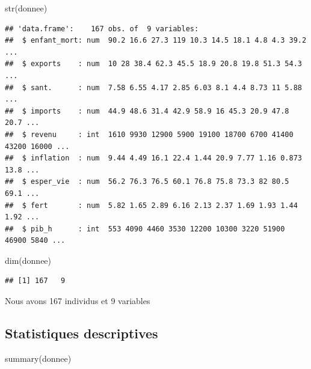 \documentclass[
]{article}
\newenvironment{Shaded}{}{}
\newcommand{\FunctionTok}[1]{#1}
\newcommand{\NormalTok}[1]{#1}
\begin{document}
\begin{Shaded}
\begin{Highlighting}[]
\FunctionTok{str}\NormalTok{(donnee)}
\end{Highlighting}
\end{Shaded}

\begin{verbatim}
## 'data.frame':    167 obs. of  9 variables:
##  $ enfant_mort: num  90.2 16.6 27.3 119 10.3 14.5 18.1 4.8 4.3 39.2 ...
##  $ exports    : num  10 28 38.4 62.3 45.5 18.9 20.8 19.8 51.3 54.3 ...
##  $ sant.      : num  7.58 6.55 4.17 2.85 6.03 8.1 4.4 8.73 11 5.88 ...
##  $ imports    : num  44.9 48.6 31.4 42.9 58.9 16 45.3 20.9 47.8 20.7 ...
##  $ revenu     : int  1610 9930 12900 5900 19100 18700 6700 41400 43200 16000 ...
##  $ inflation  : num  9.44 4.49 16.1 22.4 1.44 20.9 7.77 1.16 0.873 13.8 ...
##  $ esper_vie  : num  56.2 76.3 76.5 60.1 76.8 75.8 73.3 82 80.5 69.1 ...
##  $ fert       : num  5.82 1.65 2.89 6.16 2.13 2.37 1.69 1.93 1.44 1.92 ...
##  $ pib_h      : int  553 4090 4460 3530 12200 10300 3220 51900 46900 5840 ...
\end{verbatim}

\begin{Shaded}
\begin{Highlighting}[]
\FunctionTok{dim}\NormalTok{(donnee)}
\end{Highlighting}
\end{Shaded}

\begin{verbatim}
## [1] 167   9
\end{verbatim}

Nous avons 167 individus et 9 variables

\hypertarget{statistiques-descriptives}{%
\subsection{Statistiques descriptives}\label{statistiques-descriptives}}

\begin{Shaded}
\begin{Highlighting}[]
\FunctionTok{summary}\NormalTok{(donnee)}
\end{Highlighting}
\end{Shaded}
\end{document}
